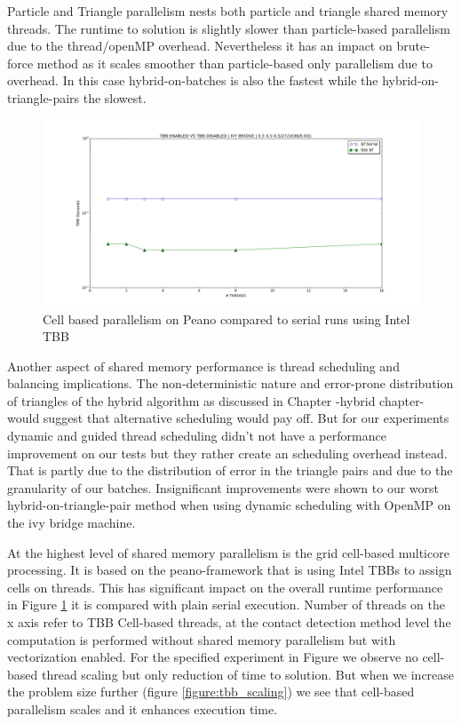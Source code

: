 Particle and Triangle parallelism nests both particle and triangle shared memory threads. The runtime to solution is slightly slower than particle-based parallelism due to the thread/openMP overhead. Nevertheless it has an impact on brute-force method as it scales smoother than particle-based only parallelism due to overhead. In this case hybrid-on-batches is also the fastest while the hybrid-on-triangle-pairs the slowest. 

\clearpage

\begin{figure}[htb]
  \begin{center}
    \includegraphics[width=1\textwidth]{experiments/random/omp/tbb_vs_serial.png}
  \end{center}
  \caption{Cell based parallelism on Peano compared to serial runs using Intel TBB}
  \label{figure:tbb_vs_serial}
\end{figure}

Another aspect of shared memory performance is thread scheduling and balancing implications.
The non-deterministic nature and error-prone distribution of triangles of the hybrid algorithm as discussed in Chapter {-hybrid chapter-} would suggest that alternative scheduling would pay off. But for our experiments dynamic and guided thread scheduling didn't not have a performance improvement on our tests but they rather create an scheduling overhead instead. That is partly due to the distribution of error in the triangle pairs and due to the granularity of our batches. Insignificant improvements were shown to our worst hybrid-on-triangle-pair method when using dynamic scheduling with OpenMP on the ivy bridge machine.    

At the highest level of shared memory parallelism is the grid cell-based multicore processing. It is based on the peano-framework that is using Intel TBBs to assign cells on threads. This has significant impact on the overall runtime performance in Figure \ref{figure:tbb_vs_serial} it is compared with plain serial execution. Number of threads on the x axis refer to TBB Cell-based threads, at the contact detection method level the computation is performed without shared memory parallelism but with vectorization enabled. For the specified experiment in Figure {} we observe no cell-based thread scaling but only reduction of time to solution. But when we increase the problem size further (figure \ref{figure:tbb_scaling}) we see that cell-based parallelism scales and it enhances execution time. 

